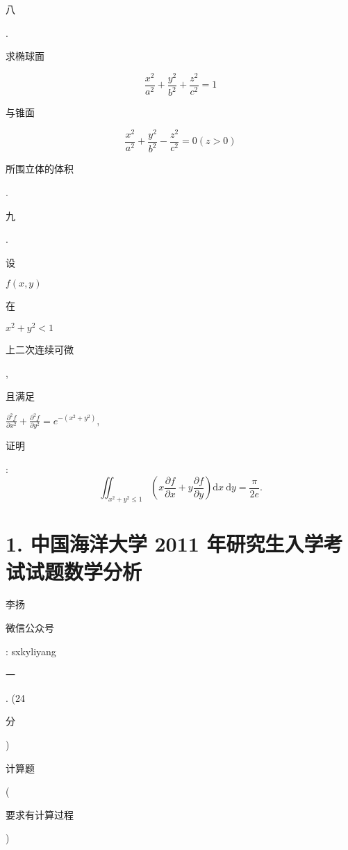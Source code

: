 \documentclass[10pt]{article}
\begin{document}
\begin{CJK}{UTF8}{mj}八\end{CJK}. \begin{CJK}{UTF8}{mj}求椭球面\end{CJK}
$$
\frac{x^{2}}{a^{2}}+\frac{y^{2}}{b^{2}}+\frac{z^{2}}{c^{2}}=1
$$
\begin{CJK}{UTF8}{mj}与锥面\end{CJK}
$$
\frac{x^{2}}{a^{2}}+\frac{y^{2}}{b^{2}}-\frac{z^{2}}{c^{2}}=0(z>0)
$$
\begin{CJK}{UTF8}{mj}所围立体的体积\end{CJK}.

\begin{CJK}{UTF8}{mj}九\end{CJK}. \begin{CJK}{UTF8}{mj}设\end{CJK} $f(x, y)$ \begin{CJK}{UTF8}{mj}在\end{CJK} $x^{2}+y^{2}<1$ \begin{CJK}{UTF8}{mj}上二次连续可微\end{CJK}, \begin{CJK}{UTF8}{mj}且满足\end{CJK} $\frac{\partial^{2} f}{\partial x^{2}}+\frac{\partial^{2} f}{\partial y^{2}}=e^{-\left(x^{2}+y^{2}\right)}$, \begin{CJK}{UTF8}{mj}证明\end{CJK}:
$$
\iint_{x^{2}+y^{2} \leqslant 1}\left(x \frac{\partial f}{\partial x}+y \frac{\partial f}{\partial y}\right) \mathrm{d} x \mathrm{~d} y=\frac{\pi}{2 e} .
$$

\section{1. 中国海洋大学 2011 年研究生入学考试试题数学分析}
\begin{CJK}{UTF8}{mj}李扬\end{CJK}

\begin{CJK}{UTF8}{mj}微信公众号\end{CJK}: sxkyliyang

\begin{CJK}{UTF8}{mj}一\end{CJK}. (24 \begin{CJK}{UTF8}{mj}分\end{CJK}) \begin{CJK}{UTF8}{mj}计算题\end{CJK} (\begin{CJK}{UTF8}{mj}要求有计算过程\end{CJK})
\end{document}
